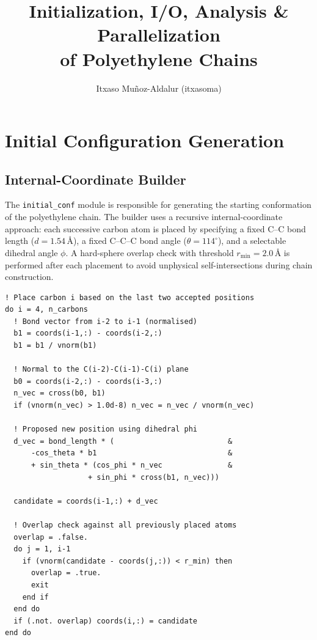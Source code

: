 \documentclass[11pt, a4paper]{article}
\begin{document}
\title{\textbf{Initialization, I/O, Analysis \& Parallelization}\\
       \large  of Polyethylene Chains}
\author{Itxaso Muñoz-Aldalur (itxasoma)}
\date{}
\maketitle
\tableofcontents
\newpage

\section{Initial Configuration Generation}
\label{sec:initial_conf}

\subsection{Internal-Coordinate Builder}

The \texttt{initial\_conf} module is responsible for generating the starting
conformation of the polyethylene chain. The builder uses a recursive
internal-coordinate approach: each successive carbon atom is placed by
specifying a fixed C--C bond length ($d = 1.54\,\text{\AA}$), a fixed C--C--C
bond angle ($\theta = 114^\circ$), and a selectable dihedral angle $\phi$.
A hard-sphere overlap check with threshold $r_{\min} = 2.0\,\text{\AA}$ is
performed after each placement to avoid unphysical self-intersections during
chain construction.

\begin{lstlisting}[caption={Core internal-coordinate placement loop in \texttt{initial\_conf.f90}.}]
! Place carbon i based on the last two accepted positions
do i = 4, n_carbons
  ! Bond vector from i-2 to i-1 (normalised)
  b1 = coords(i-1,:) - coords(i-2,:)
  b1 = b1 / vnorm(b1)

  ! Normal to the C(i-2)-C(i-1)-C(i) plane
  b0 = coords(i-2,:) - coords(i-3,:)
  n_vec = cross(b0, b1)
  if (vnorm(n_vec) > 1.0d-8) n_vec = n_vec / vnorm(n_vec)

  ! Proposed new position using dihedral phi
  d_vec = bond_length * (                          &
      -cos_theta * b1                              &
      + sin_theta * (cos_phi * n_vec               &
                   + sin_phi * cross(b1, n_vec)))

  candidate = coords(i-1,:) + d_vec

  ! Overlap check against all previously placed atoms
  overlap = .false.
  do j = 1, i-1
    if (vnorm(candidate - coords(j,:)) < r_min) then
      overlap = .true.
      exit
    end if
  end do
  if (.not. overlap) coords(i,:) = candidate
end do
\end{lstlisting}
\end{document}
